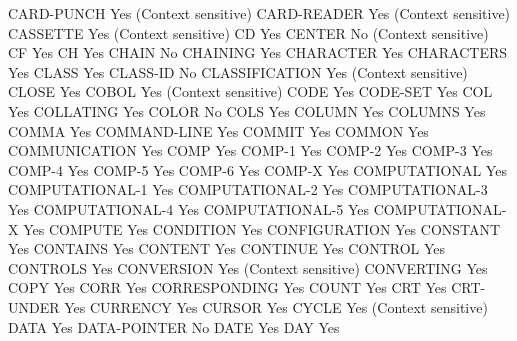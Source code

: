 CARD-PUNCH                      Yes (Context sensitive)
CARD-READER                     Yes (Context sensitive)
CASSETTE                        Yes (Context sensitive)
CD                              Yes
CENTER                          No (Context sensitive)
CF                              Yes
CH                              Yes
CHAIN                           No
CHAINING                        Yes
CHARACTER                       Yes
CHARACTERS                      Yes
CLASS                           Yes
CLASS-ID                        No
CLASSIFICATION                  Yes (Context sensitive)
CLOSE                           Yes
COBOL                           Yes (Context sensitive)
CODE                            Yes
CODE-SET                        Yes
COL                             Yes
COLLATING                       Yes
COLOR                           No
COLS                            Yes
COLUMN                          Yes
COLUMNS                         Yes
COMMA                           Yes
COMMAND-LINE                    Yes
COMMIT                          Yes
COMMON                          Yes
COMMUNICATION                   Yes
COMP                            Yes
COMP-1                          Yes
COMP-2                          Yes
COMP-3                          Yes
COMP-4                          Yes
COMP-5                          Yes
COMP-6                          Yes
COMP-X                          Yes
COMPUTATIONAL                   Yes
COMPUTATIONAL-1                 Yes
COMPUTATIONAL-2                 Yes
COMPUTATIONAL-3                 Yes
COMPUTATIONAL-4                 Yes
COMPUTATIONAL-5                 Yes
COMPUTATIONAL-X                 Yes
COMPUTE                         Yes
CONDITION                       Yes
CONFIGURATION                   Yes
CONSTANT                        Yes
CONTAINS                        Yes
CONTENT                         Yes
CONTINUE                        Yes
CONTROL                         Yes
CONTROLS                        Yes
CONVERSION                      Yes (Context sensitive)
CONVERTING                      Yes
COPY                            Yes
CORR                            Yes
CORRESPONDING                   Yes
COUNT                           Yes
CRT                             Yes
CRT-UNDER                       Yes
CURRENCY                        Yes
CURSOR                          Yes
CYCLE                           Yes (Context sensitive)
DATA                            Yes
DATA-POINTER                    No
DATE                            Yes
DAY                             Yes

